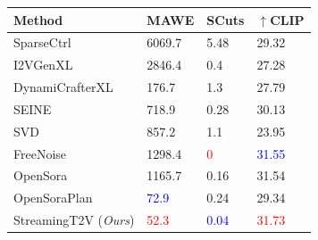 \begin{table}[tb]
    \centering
    
    \begin{tabular}{@{}l|ll|l@{}}
        \toprule
        Method & \textbf{MAWE} & \textbf{SCuts} & $\uparrow$CLIP \\
        
        \midrule
        SparseCtrl \cite{guo2023sparsectrl} &  6069.7  &  5.48   &  29.32  \\
        I2VGenXL \cite{2023i2vgenxl} &  2846.4  &  0.4 &  27.28  \\
        DynamiCrafterXL \cite{xing2023dynamicrafter} &  176.7  &  1.3   &  27.79 \\
        SEINE \cite{chen2023seine} &  718.9  &  0.28  &  30.13 \\
        SVD \cite{SVD} &  857.2  &  1.1   &  23.95\\
        FreeNoise \cite{qiu2023freenoise} &  1298.4  &  \textcolor{red}{0}  &  \textcolor{blue}{31.55} \\
        OpenSora \cite{opensora} & 1165.7 & 0.16 & 31.54 \\
        OpenSoraPlan \cite{opensoraplan} & \textcolor{blue}{72.9} & 0.24 & 29.34  \\
        \midrule
        StreamingT2V (\textit{{\small Ours}}) &  \textcolor{red}{52.3}  &  \textcolor{blue}{0.04} &  \textcolor{red}{31.73}\\
        

\end{tabular}
\end{table}
